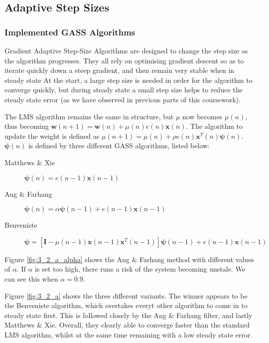 \documentclass[./main.tex]{subfiles}
\begin{document}
\subsection{Adaptive Step Sizes}

\subsubsection{Implemented GASS Algorithms}
Gradient Adaptive Step-Size Algorithms are designed to change the step size as the algorithm progresses. They all rely on optimising gradient descent so as to iterate quickly down a steep gradient, and then remain very stable when in steady state At the start, a large step size is needed in order for the algorithm to converge quickly, but during steady state a small step size helps to reduce the steady state error (as we have observed in previous parts of this coursework).

The LMS algorithm remains the same in structure, but $\mu$ now becomes $\mu(n)$, thus becoming $  \mathbf{w}(n+1) = \mathbf{w}(n) + \mu(n) e(n) \mathbf{x}(n) $. The algorithm to update the weight is defined as $ \mu(n+1) = \mu(n) + \rho e(n) \mathbf{x}^T(n) \boldsymbol{\psi}(n)$. $ \boldsymbol{\psi}(n) $ is defined by three different GASS algorithms, listed below:

\begin{description}
	\item[Matthews \& Xie] $  \boldsymbol{\psi}(n) = e(n-1) \mathbf{x}(n-1) $
	\item[Ang \& Farhang] $  \boldsymbol{\psi}(n) = \alpha  \boldsymbol{\psi}(n - 1) +  e(n-1) \mathbf{x}(n-1) $
	\item[Benveniste] $ \boldsymbol{\psi} = [ \mathbf{I} - \mu(n-1) \mathbf{x}(n-1) \mathbf{x}^T(n-1)  ] \boldsymbol{\psi}(n - 1) + e(n-1) \mathbf{x}(n-1) $
\end{description}

Figure \ref{fig:3_2_a_alpha} shows the Ang \& Farhang method with different values of $\alpha$. If $ \alpha $ is set too high, there runs a risk of the system becoming unstale. We can see this when $\alpha = 0.9$.

Figure \ref{fig:3_2_a} shows the three different variants. The winner appears to be the Benveniste algorithm, which overtakes everyt other algorithm to come in to steady state first. This is followed closely by the Ang \& Farhang filter, and lastly Matthews \& Xie. Overall, they clearly able to converge faster than the standard LMS algorithm, whilst at the same time remaining with a low steady state error.
\end{document}
